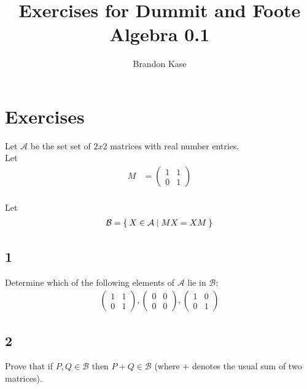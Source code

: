 \documentclass[12pt]{article}
\begin{document}
 
\title{Exercises for Dummit and Foote Algebra 0.1}
\author{Brandon Kase}
\maketitle
 
\section*{Exercises}

Let $\mathcal{A}$ be the set set of $2 x 2$ matrices with real number entries. \\

Let
\begin{align*}
M &= \begin{pmatrix}
1 & 1 \\
0 & 1
\end{pmatrix}
\end{align*} \\

Let
\begin{align*}
\mathcal{B} = \Set{X \in \mathcal{A} | M X = X M}
\end{align*}

\subsection*{1}
Determine which of the following elements of $\mathcal{A}$ lie in $\mathcal{B}$: \\

\begin{align*}
\begin{pmatrix}
1 & 1 \\
0 & 1
\end{pmatrix},
\begin{pmatrix}
0 & 0 \\
0 & 0
\end{pmatrix},
\begin{pmatrix}
1 & 0 \\
0 & 1
\end{pmatrix}
\end{align*}

\subsection*{2}

Prove that if $P,Q \in \mathcal{B}$ then $P + Q \in \mathcal{B}$ (where $+$ denotes the usual sum of two matrices).
\end{document}

